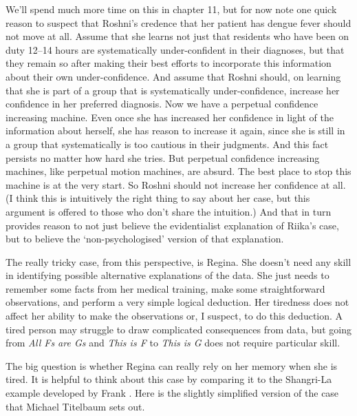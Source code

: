 We'll spend much more time on this in chapter 11, but for now note one quick reason to suspect that \gls{Roshni}'s credence that her patient has dengue fever should not move at all. Assume that she learns not just that residents who have been on duty 12--14 hours are systematically under-confident in their diagnoses, but that they remain so after making their best efforts to incorporate this information about their own under-confidence. And assume that \gls{Roshni} should, on learning that she is part of a group that is systematically under-confidence, increase her confidence in her preferred diagnosis. Now we have a perpetual confidence increasing machine. Even once she has increased her confidence in light of the information about herself, she has reason to increase it again, since she is still in a group that systematically is too cautious in their judgments. And this fact persists no matter how hard she tries. But perpetual confidence increasing machines, like perpetual motion machines, are absurd. The best place to stop this machine is at the very start. So \gls{Roshni} should not increase her confidence at all. (I think this is intuitively the right thing to say about her case, but this argument is offered to those who don't share the intuition.) And that in turn provides reason to not just believe the evidentialist explanation of \gls{Riika}'s case, but to believe the `non-psychologised' version of that explanation.

The really tricky case, from this perspective, is \gls{Regina}. She doesn't need any skill in identifying possible alternative explanations of the data. She just needs to remember some facts from her medical training, make some straightforward observations, and perform a very simple logical deduction. Her tiredness does not affect her ability to make the observations or, I suspect, to do this deduction. A tired person may struggle to draw complicated consequences from data, but going from \emph{All Fs are Gs} and \emph{This is F} to \emph{This is G} does not require particular skill.

The big question is whether \gls{Regina} can really rely on her memory when she is tired. It is helpful to think about this case by comparing it to the Shangri-La example developed by \gls{Frank} \citet{Arntzenius2003}. Here is the slightly simplified version of the case that Michael Titelbaum sets out.

